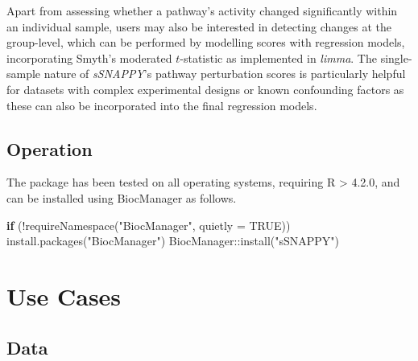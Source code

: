 \documentclass[9pt,a4paper,]{extarticle}
\newenvironment{Shaded}{\begin{snugshade}}{\end{snugshade}}
\newcommand{\AttributeTok}[1]{\textcolor[rgb]{0.77,0.63,0.00}{#1}}
\newcommand{\ConstantTok}[1]{\textcolor[rgb]{0.00,0.00,0.00}{#1}}
\newcommand{\ControlFlowTok}[1]{\textcolor[rgb]{0.13,0.29,0.53}{\textbf{#1}}}
\newcommand{\FunctionTok}[1]{\textcolor[rgb]{0.00,0.00,0.00}{#1}}
\newcommand{\NormalTok}[1]{#1}
\newcommand{\SpecialCharTok}[1]{\textcolor[rgb]{0.00,0.00,0.00}{#1}}
\newcommand{\StringTok}[1]{\textcolor[rgb]{0.31,0.60,0.02}{#1}}
\begin{document}
Apart from assessing whether a pathway's activity changed significantly within an individual sample, users may also be interested in detecting changes at the group-level, which can be performed by modelling scores with regression models, incorporating Smyth's moderated \(t\)-statistic\citep{Smyth_2004} as implemented in \emph{limma}\citep{limma_2015}.
The single-sample nature of \emph{sSNAPPY}'s pathway perturbation scores is particularly helpful for datasets with complex experimental designs or known confounding factors as these can also be incorporated into the final regression models.

\hypertarget{operation}{%
\subsection{Operation}\label{operation}}

The package has been tested on all operating systems, requiring R \textgreater{} 4.2.0, and can be installed using BiocManager as follows.

\begin{Shaded}
\begin{Highlighting}[]
\ControlFlowTok{if}\NormalTok{ (}\SpecialCharTok{!}\FunctionTok{requireNamespace}\NormalTok{(}\StringTok{"BiocManager"}\NormalTok{, }\AttributeTok{quietly =} \ConstantTok{TRUE}\NormalTok{))}
  \FunctionTok{install.packages}\NormalTok{(}\StringTok{"BiocManager"}\NormalTok{)}
\NormalTok{BiocManager}\SpecialCharTok{::}\FunctionTok{install}\NormalTok{(}\StringTok{"sSNAPPY"}\NormalTok{)}
\end{Highlighting}
\end{Shaded}

\hypertarget{use-cases}{%
\section{Use Cases}\label{use-cases}}

\hypertarget{data}{%
\subsection{Data}\label{data}}
\end{document}
